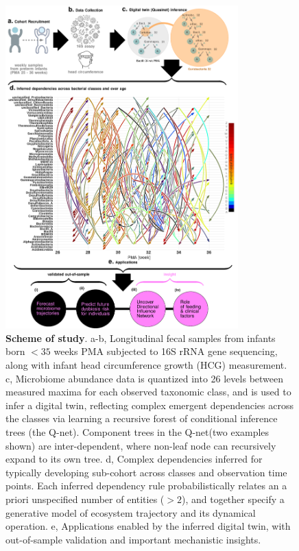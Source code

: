 \documentclass[onecolumn,10pt]{IEEEtran}
\newcommand{\captionN}[1]{\caption{\color{darkgray} \sffamily \fontsize{9}{10}\selectfont #1  }}
\def\qnet{Q-net\xspace}
\begin{document}
\begin{figure}[!ht]
\centering
\includegraphics[width=0.8\textwidth]{fig1.pdf}
\captionN{\textbf{Scheme of study}. a-b, Longitudinal fecal samples from infants
born $<35$ weeks PMA  subjected
to 16S rRNA gene sequencing, along with infant head circumference growth (HCG) measurement. c, Microbiome abundance data is quantized into 26 levels between measured maxima for each observed taxonomic class, and is used to infer a digital twin, reflecting complex emergent dependencies across the classes via learning  a recursive forest of  conditional inference trees (the \qnet). Component trees in the \qnet (two examples shown) are inter-dependent, where  non-leaf node can recursively expand to its own tree. d, Complex dependencies inferred for typically developing sub-cohort across classes and observation time points. Each inferred dependency rule probabilistically relates an a priori unspecified number of entities ($>2$), and together specify a generative model of ecosystem trajectory and its dynamical operation. e, Applications enabled by the inferred digital twin, with out-of-sample validation and important mechanistic insights. }\label{figscheme}
\end{figure} 
\end{document}
